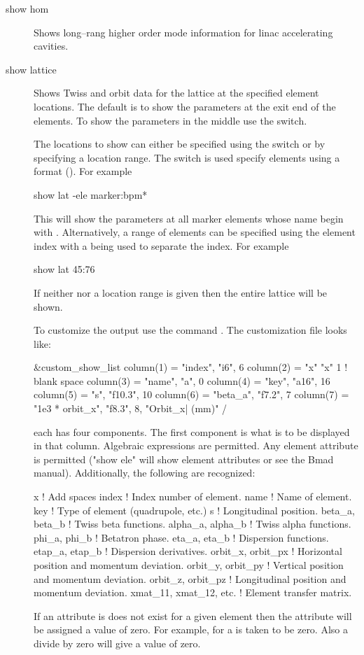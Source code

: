 {{\begin{description}
  \item[show hom]
Shows long--rang higher order mode information for linac accelerating
cavities.

  \item[show lattice]
Shows Twiss and orbit data for the  lattice at the specified
element locations. The default is to show the parameters at the exit
end of the elements. To show the parameters in the middle use the
 switch.

The locations to show can either be specified using
the  switch or by specifying a location range. 
The  switch is used specify elements using a
 format (). For example
\begin{example}
show lat -ele marker:bpm*
\end{example}
This will show the parameters at all marker elements whose name begin
with . Alternatively, a range of elements can be specified
using the element index with a  being used to separate the
index. For example
\begin{example}
  show lat  45:76
\end{example}
If neither  nor a location range is given then
the entire lattice will be shown.

To customize the output use the command . The customization file looks like:
\begin{example}
  &custom_show_list
    column(1) = "index",   "i6",     6 
    column(2) = "x"        "x"       1       ! blank space
    column(3) = "name",    "a",      0
    column(4) = "key",     "a16",   16
    column(5) = "s",       "f10.3", 10
    column(6) = "beta_a",  "f7.2",   7
    column(7) = "1e3 * orbit_x", "f8.3", 8, "Orbit_x| (mm)" 
  /
\end{example}
each  has four components. The first component is what
is to be displayed in that column. Algebraic expressions are
permitted. Any element attribute is permitted ("show ele" will show
element attributes or see the Bmad manual). Additionally, the following
are recognized:
\begin{example}
  x                      ! Add spaces
  index                  ! Index number of element.
  name                   ! Name of element.
  key                    ! Type of element (quadrupole, etc.)
  s                      ! Longitudinal position.
  beta_a,  beta_b        ! Twiss beta functions.
  alpha_a, alpha_b       ! Twiss alpha functions.
  phi_a,   phi_b         ! Betatron phase.
  eta_a,   eta_b         ! Dispersion functions.
  etap_a,  etap_b        ! Dispersion derivatives.
  orbit_x, orbit_px      ! Horizontal position and momentum deviation.
  orbit_y, orbit_py      ! Vertical position and momentum deviation.
  orbit_z, orbit_pz      ! Longitudinal position and momentum deviation.
  xmat_11, xmat_12, etc. ! Element transfer matrix.
\end{example}
If an attribute is does not exist for a given element then the
attribute will be assigned a value of zero. For example, 
for a  is taken to be zero. Also a divide by zero will
give a value of zero.


\end{description}}}
